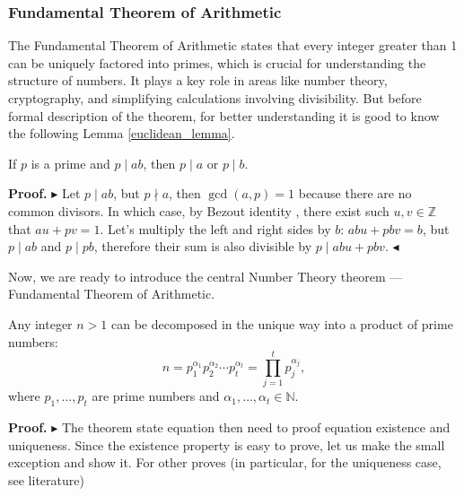 \documentclass[../lecture-notes.tex]{subfiles}
\begin{document}
\subsubsection{Fundamental Theorem of Arithmetic}
The Fundamental Theorem of Arithmetic states that every integer greater than 1 can be uniquely factored into primes, which is crucial for understanding the structure of numbers. 
It plays a key role in areas like number theory, cryptography, and simplifying calculations involving divisibility. 
But before formal description of the theorem, for better understanding it is good to know the following Lemma \ref{euclidean_lemma}.

\begin{lemma} \label{euclidean_lemma}
    If $p$ is a prime and $p \mid ab$, then $p \mid a$ or $p \mid b$.
\end{lemma}

\textbf{Proof.} 
$\blacktriangleright$
Let $p \mid ab$, but $ p \nmid a$, then $\gcd(a, p) = 1$ because there are no common divisors.
In which case, by Bezout identity , there exist such $u, v \in \mathbb{Z}$ that $au + pv = 1$.
Let's multiply the left and right sides by $b$: $abu + pbv = b$, but $p \mid ab$ and $p \mid pb$, therefore their sum is also divisible by $p \mid abu + pbv$. 
$\blacktriangleleft$

Now, we are ready to introduce the central Number Theory theorem --- Fundamental
Theorem of Arithmetic.

\begin{theorem}\label{th:fundamental_arithmetic}
    Any integer $n>1$ can be decomposed in the unique way into a product of prime numbers:
    \begin{equation*}
        n = p_1^{\alpha_1}p_2^{\alpha_2}\cdots p_t^{\alpha_t} = \prod_{j=1}^t p_j^{\alpha_j},
    \end{equation*}
    where $p_1,\dots,p_t$ are prime numbers and $\alpha_1,\dots,\alpha_t \in \mathbb{N}$.
\end{theorem}

\textbf{Proof.} 
$\blacktriangleright$  
The theorem state equation then need to proof equation existence and uniqueness. Since the existence property is 
easy to prove, let us make the small exception and show it. For other proves (in particular, for the uniqueness case, see literature)
\end{document}
